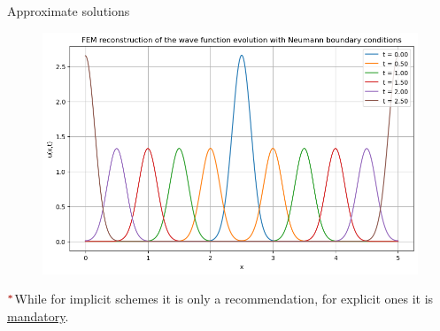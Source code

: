 \begin{frame}{Approximate solutions}
{\begin{minipage}{0.49\textwidth}
        \vspace{-0.2cm}

        \begin{figure}[H]
            \centering
            \includegraphics[width=\textwidth]{Immagini/plot-neumann-approximated.png}
        \end{figure}
    \end{minipage}}

    \vfill

    $^{\boldsymbol{\textcolor{BrickRed}{\ast}}}$\scriptsize{While for implicit schemes it is only a recommendation, for explicit ones it is \underline{mandatory}.}

    \normalsize
\end{frame}

